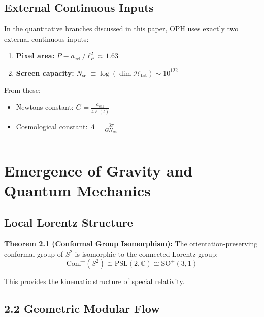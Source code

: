 \subsection{External Continuous Inputs}\label{14-fundamental-parameters}

In the quantitative branches discussed in this paper, OPH uses exactly two external continuous inputs:

\begin{enumerate}
\def\labelenumi{\arabic{enumi}.}
\tightlist
\item
 \textbf{Pixel area:} \(P \equiv a_{\text{cell}}/\ell_P^2 \approx 1.63\)
\item
 \textbf{Screen capacity:} \(N_{\mathrm{scr}} \equiv \log(\dim \mathcal{H}_{\text{tot}}) \sim 10^{122}\)
\end{enumerate}

From these:

\begin{itemize}
\tightlist
\item
 Newton\textquotesingle s constant: \(G = \frac{a_{\text{cell}}}{4\bar{\ell}(t)}\)
\item
 Cosmological constant: \(\Lambda = \frac{3\pi}{G N_{\mathrm{scr}}}\)
\end{itemize}

\begin{center}\rule{0.5\linewidth}{0.5pt}\end{center}

\section{Emergence of Gravity and Quantum Mechanics}\label{2-emergence-of-gravity-and-quantum-mechanics}

\subsection{Local Lorentz Structure}\label{21-local-lorentz-structure}

\textbf{Theorem 2.1 (Conformal Group Isomorphism):} The orientation-preserving conformal group of \(S^2\) is isomorphic to the connected Lorentz group: \[\text{Conf}^+(S^2) \cong \text{PSL}(2,\mathbb{C}) \cong \text{SO}^+(3,1)\]

This provides the kinematic structure of special relativity.

\subsection{2.2 Geometric Modular Flow}\label{22-geometric-modular-flow}

